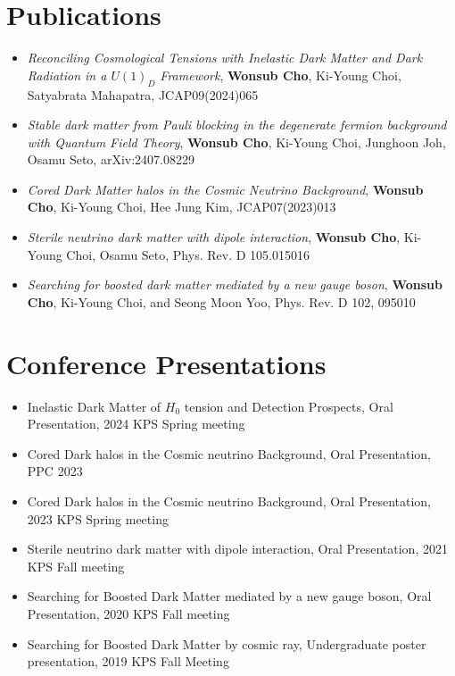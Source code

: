 \documentclass{article}
\begin{document}
\section{Publications}
\begin{itemize}
	\item \emph{Reconciling Cosmological Tensions with Inelastic Dark Matter and Dark Radiation in a $U(1)_D$ Framework},  \textbf{Wonsub Cho}, Ki-Young Choi, Satyabrata Mahapatra, JCAP09(2024)065
	\item \emph{Stable dark matter from Pauli blocking in the degenerate fermion background with Quantum Field Theory}, \textbf{Wonsub Cho}, Ki-Young Choi, Junghoon Joh, Osamu Seto, arXiv:2407.08229
	\item \emph{Cored Dark Matter halos in the Cosmic Neutrino Background}, \textbf{Wonsub Cho}, Ki-Young Choi, Hee Jung Kim, JCAP07(2023)013
	\item \emph{Sterile neutrino dark matter with dipole interaction}, \textbf{Wonsub Cho}, Ki-Young Choi, Osamu Seto, Phys. Rev. D 105.015016
	\item \emph{Searching for boosted dark matter mediated by a new gauge boson}, \textbf{Wonsub Cho}, Ki-Young Choi, and Seong Moon Yoo, Phys. Rev. D 102, 095010
\end{itemize}

\section{Conference Presentations}
    \begin{itemize}
	\item Inelastic Dark Matter of $H_0$ tension and Detection Prospects, Oral Presentation, 2024 KPS Spring meeting
    \item Cored Dark halos in the Cosmic neutrino Background, Oral Presentation, PPC 2023
    \item Cored Dark halos in the Cosmic neutrino Background, Oral Presentation, 2023 KPS Spring meeting
    \item Sterile neutrino dark matter with dipole interaction, Oral Presentation, 2021 KPS Fall meeting
    \item Searching for Boosted Dark Matter mediated by a new gauge boson, Oral Presentation, 2020 KPS Fall meeting
    \item Searching for Boosted Dark Matter by cosmic ray, Undergraduate poster presentation, 2019 KPS Fall Meeting
    \end{itemize}
\end{document}
